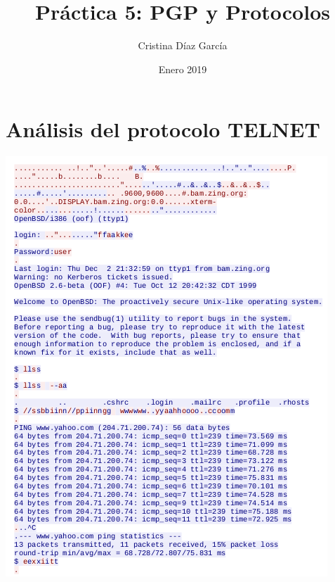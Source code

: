 \documentclass{article}
\title{Práctica 5: PGP y Protocolos}
\author{Cristina Díaz García}
\date{Enero 2019}
\begin{document}

\begin{titlingpage}
\maketitle
\end{titlingpage}

\newpage

\tableofcontents

\newpage

\section{Análisis del protocolo TELNET}

\begin{center}
\includegraphics[scale=0.5]{images/telnet.png}
\end{center}
\end{document}
